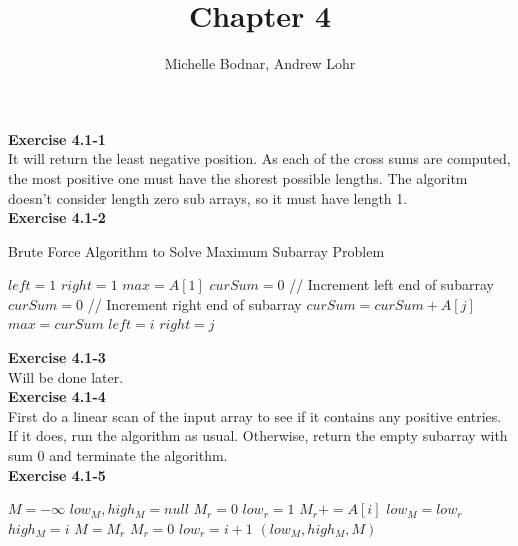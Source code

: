 \documentclass{article}
\title{Chapter 4}
\author{Michelle Bodnar, Andrew Lohr}
\begin{document}
\maketitle

\noindent\textbf{Exercise 4.1-1}\\

It will return the least negative position. As each of the cross sums are computed, the most positive one must have the shorest possible lengths. The algoritm doesn't consider length zero sub arrays, so it must have length 1.\\

\noindent\textbf{Exercise 4.1-2}\\

\begin{algorithm}
\caption{Brute Force Algorithm to Solve Maximum Subarray Problem}
\begin{algorithmic}
\State $left = 1$
\State $right = 1$
\State $max = A[1]$
\State $curSum = 0$
 // Increment left end of subarray
	\State $curSum = 0$
	 // Increment right end of subarray
		\State $curSum = curSum + A[j]$
			\State $max = curSum$
			\State $left = i$
			\State $right = j$
		\EndIf
	\EndFor
\EndFor
\end{algorithmic}
\end{algorithm}

\noindent\textbf{Exercise 4.1-3}\\

Will be done later. \\

\noindent\textbf{Exercise 4.1-4}\\

First do a linear scan of the input array to see if it contains any positive entries.  If it does, run the algorithm as usual.  Otherwise, return the empty subarray with sum 0 and terminate the algorithm. \\

\noindent\textbf{Exercise 4.1-5}\\

\begin{algorithm}
\begin{algorithmic}[1]
\State $M =-\infty$
\State $low_M, high_M = null$
\State $M_r = 0$
\State $low_r = 1$
\State $M_r += A[i]$
\State $low_M = low_r$
\State $high_M = i$
\State $M= M_r$
\EndIf
{}
\State $M_r = 0$
\State $low_r = i+1$
\EndIf
\State \Return $(low_M,high_M,M)$
\EndFor


\end{algorithmic}
\end{algorithm}
\end{document}
